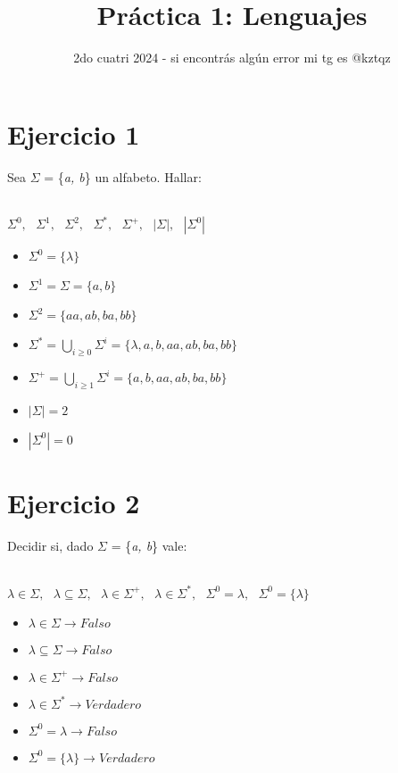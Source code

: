 \documentclass{article}
\begin{document}
\title{Práctica 1: Lenguajes}
\date{2do cuatri 2024 - si encontrás algún error mi tg es @kztqz}

\renewcommand{\baselinestretch}{1.5} 

\maketitle

\section*{Ejercicio 1}{Sea $\Sigma$ = \{\textit{a, b}\} un alfabeto. Hallar:
\\
\\
\centerline{$\Sigma^0,\ \ \ \Sigma^1,\ \ \ \Sigma^2,\ \ \ \Sigma^*,\ \ \ \Sigma^+,\ \ \ |\Sigma|,\ \ \ |\Sigma^0|$}

\begin{itemize}
    \item $\Sigma^0 = \{\lambda\}$
    \item $\Sigma^1 = \Sigma = \{a, b\}$
    \item $\Sigma^2 = \{aa, ab, ba, bb\}$
    \item $\Sigma^* = \bigcup\limits_{i \ge 0}\Sigma^i = \{\lambda, a, b, aa, ab, ba, bb\}$
    \item $\Sigma^+ = \bigcup\limits_{i \ge 1}\Sigma^i = \{a, b, aa, ab, ba, bb\}$
    \item $|\Sigma| = 2$
    \item $|\Sigma^0| = 0$
\end{itemize}

\section*{Ejercicio 2}{Decidir si, dado $\Sigma$ = \{\textit{a, b}\} vale:}
\\
\\
\centerline{$\lambda\in\Sigma,\ \ \ \lambda\subseteq\Sigma,\ \ \ \lambda\in\Sigma^+,\ \ \ \lambda\in\Sigma^*,\ \ \ \Sigma^0=\lambda,\ \ \ \Sigma^0=\{\lambda\}$}

\begin{itemize}
    \item $\lambda\in\Sigma \rightarrow {Falso}$ 
    \item $\lambda\subseteq\Sigma \rightarrow {Falso}$ 
    \item $\lambda\in\Sigma^+ \rightarrow {Falso}$ 
    \item $\lambda\in\Sigma^* \rightarrow {Verdadero}$ 
    \item $\Sigma^0=\lambda \rightarrow {Falso}$ 
    \item $\Sigma^0=\{\lambda\} \rightarrow {Verdadero}$ 
\end{itemize}

}
\end{document}
